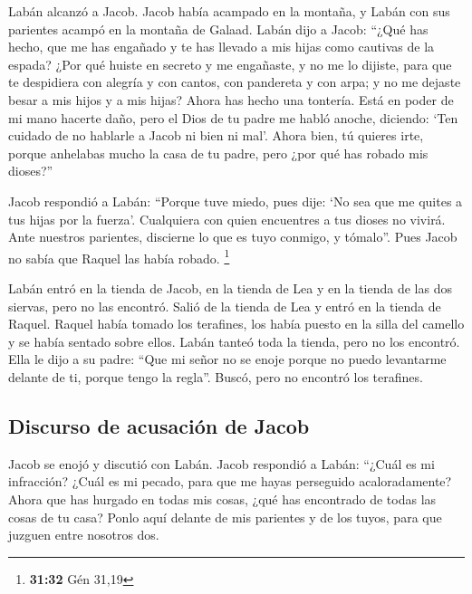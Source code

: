  Labán alcanzó a Jacob. Jacob había acampado en la
montaña, y Labán con sus parientes acampó en la montaña de Galaad.
 Labán dijo a Jacob: ``¿Qué has hecho, que me has
engañado y te has llevado a mis hijas como cautivas de la espada?
 ¿Por qué huiste en secreto y me engañaste, y no me lo
dijiste, para que te despidiera con alegría y con cantos, con pandereta
y con arpa;  y no me dejaste besar a mis hijos y a mis
hijas? Ahora has hecho una tontería.  Está en poder de mi
mano hacerte daño, pero el Dios de tu padre me habló anoche, diciendo:
`Ten cuidado de no hablarle a Jacob ni bien ni mal'. 
Ahora bien, tú quieres irte, porque anhelabas mucho la casa de tu padre,
pero ¿por qué has robado mis dioses?''

 Jacob respondió a Labán: ``Porque tuve miedo, pues dije:
`No sea que me quites a tus hijas por la fuerza'. 
Cualquiera con quien encuentres a tus dioses no vivirá. Ante nuestros
parientes, discierne lo que es tuyo conmigo, y tómalo''. Pues Jacob no
sabía que Raquel las había robado. \footnote{\textbf{31:32} Gén 31,19}

 Labán entró en la tienda de Jacob, en la tienda de Lea y
en la tienda de las dos siervas, pero no las encontró. Salió de la
tienda de Lea y entró en la tienda de Raquel.  Raquel
había tomado los terafines, los había puesto en la silla del camello y
se había sentado sobre ellos. Labán tanteó toda la tienda, pero no los
encontró.  Ella le dijo a su padre: ``Que mi señor no se
enoje porque no puedo levantarme delante de ti, porque tengo la regla''.
Buscó, pero no encontró los terafines.

\hypertarget{discurso-de-acusaciuxf3n-de-jacob}{%
\subsection{Discurso de acusación de
Jacob}\label{discurso-de-acusaciuxf3n-de-jacob}}

 Jacob se enojó y discutió con Labán. Jacob respondió a
Labán: ``¿Cuál es mi infracción? ¿Cuál es mi pecado, para que me hayas
perseguido acaloradamente?  Ahora que has hurgado en
todas mis cosas, ¿qué has encontrado de todas las cosas de tu casa?
Ponlo aquí delante de mis parientes y de los tuyos, para que juzguen
entre nosotros dos.

